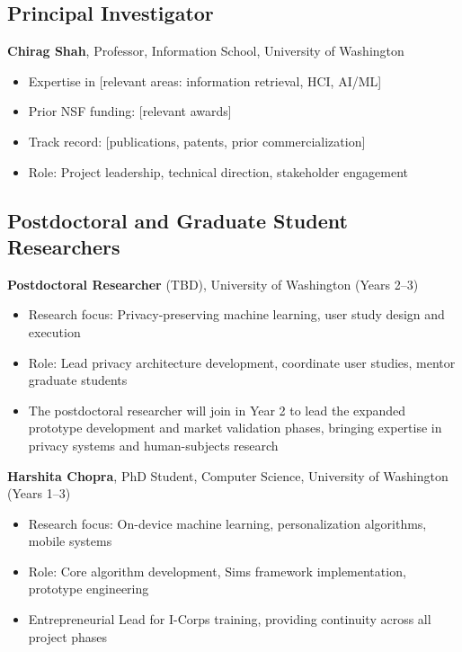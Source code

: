 \documentclass[11pt]{article}
\begin{document}
\vspace*{-8pt}
\subsection{Principal Investigator}
\vspace*{-8pt}
\textbf{Chirag Shah}, Professor, Information School, University of Washington
\begin{itemize}[noitemsep]
    \item Expertise in [relevant areas: information retrieval, HCI, AI/ML]
    \item Prior NSF funding: [relevant awards]
    \item Track record: [publications, patents, prior commercialization]
    \item Role: Project leadership, technical direction, stakeholder engagement
\end{itemize}

\subsection{Postdoctoral and Graduate Student Researchers}
\vspace*{-8pt}
\textbf{Postdoctoral Researcher} (TBD), University of Washington (Years 2--3)
\begin{itemize}[noitemsep]
    \item Research focus: Privacy-preserving machine learning, user study design and execution
    \item Role: Lead privacy architecture development, coordinate user studies, mentor graduate students
    \item The postdoctoral researcher will join in Year 2 to lead the expanded prototype development and market validation phases, bringing expertise in privacy systems and human-subjects research
\end{itemize}

\noindent
\textbf{Harshita Chopra}, PhD Student, Computer Science, University of Washington (Years 1--3)
\begin{itemize}[noitemsep]
    \item Research focus: On-device machine learning, personalization algorithms, mobile systems
    \item Role: Core algorithm development, Sims framework implementation, prototype engineering
    \item Entrepreneurial Lead for I-Corps training, providing continuity across all project phases
\end{itemize}
\end{document}
